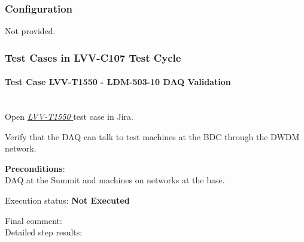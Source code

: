 \documentclass[DM,lsstdraft,STR,toc]{lsstdoc}
\begin{document}
  \subsubsection{Configuration}
    Not provided.

  \subsubsection{Test Cases in LVV-C107 Test Cycle}


    \paragraph{Test Case LVV-T1550 - LDM-503-10 DAQ Validation
 }\mbox{}\\

Open  \href{https://jira.lsstcorp.org/secure/Tests.jspa#/testCase/LVV-T1550}{\textit{ LVV-T1550 } }
test case in Jira.

    Verify that the DAQ can talk to test machines at the BDC through the
DWDM network.~


    \textbf{ Preconditions}:\\
    DAQ at the Summit and machines on networks at the base.~~


    Execution status: {\bf Not Executed }

    Final comment:\\


    Detailed step results:
\end{document}
